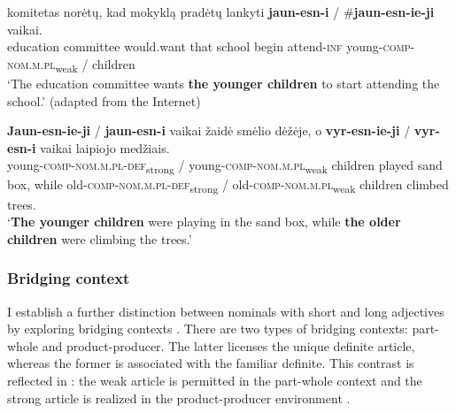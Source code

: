 \documentclass[output=paper,
modfonts
]{langscibook}
\begin{document}
\begin{exe}
	\ex \label{ex:sereikaite:50}
	 {komitetas} {norėtų}, {kad} {mokyklą} {pradėtų} {lankyti} \textbf{jaun-esn-i} \textnormal{/} \textnormal{\#}\textbf{jaun-esn-ie-ji} {vaikai}.\\
	education committee would.want that school begin attend-\textsc{inf} {young-\textsc{comp}-\textsc{nom.m.pl}\textsubscript{weak}} /  children\\
	\trans `The education committee wants \textbf{the younger children} to start attending the school.' (adapted from the Internet)
\end{exe}

\begin{exe}
	\ex \label{ex:sereikate:51}
	\gll \textbf{Jaun-esn-ie-ji} \textnormal{/} \textbf{jaun-esn-i} {vaikai} {žaidė} {smėlio} {dėžėje}, {o} \textbf{vyr-esn-ie-ji} \textnormal{/} \textbf{vyr-esn-i} {vaikai} {laipiojo} {medžiais}.\\
	{young-\textsc{comp}-\textsc{nom.m.pl}-\textsc{def}\textsubscript{strong}} / {young-\textsc{comp}-\textsc{nom.m.pl}\textsubscript{weak}} children played sand box, while {old-\textsc{comp}-\textsc{nom.m.pl}-\textsc{def}\textsubscript{strong}} / {old-\textsc{comp}-\textsc{nom.m.pl}\textsubscript{weak}} children climbed trees.\\
	\trans `\textbf{The younger children} were playing in the sand box, while \textbf{the older children} were climbing the trees.' 
\end{exe}

\subsubsection{Bridging context}

I establish a further  distinction between nominals with short and long adjectives by exploring bridging contexts \citep{Clark1975}. There are two types of bridging contexts: part-whole and product-producer. The latter licenses the unique definite article, whereas the former is associated with the familiar definite. This contrast is reflected in : the weak article is permitted in the part-whole context  and the strong article is realized in the product-producer environment . 
 
\end{document}

